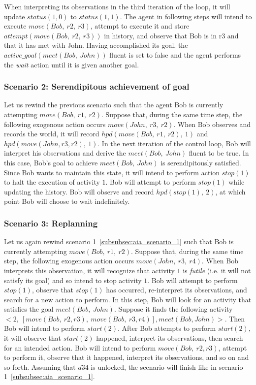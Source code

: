 When interpreting its observations in the third iteration of the loop, it will update $status(1,0)$ to $status(1,1)$.
The agent in following steps will intend to execute $move(Bob,\ r2,\ r3)$, attempt to execute it and store $attempt(move(Bob,\ r2,\ r3))$ in history, and observe that Bob is in r3 and that it has met with John.
Having accomplished its goal, the $active\_goal(meet(Bob,\ John))$ fluent is set to false and the agent performs the \textit{wait} action until it is given another goal.

\subsubsection{Scenario 2: Serendipitous achievement of goal~\cite{blount_towards_2014}}
\label{subsubsec:aia_scenario_2}

Let us rewind the previous scenario such that the agent Bob is currently attempting $move(Bob,\ r1,\ r2)$.
Suppose that, during the same time step, the following exogenous action occurs $move(John,\ r3,\ r2)$.
When Bob observes and records the world, it will record $hpd(move(Bob,\ r1,\ r2),\ 1)$ and $hpd(move(John,r3,r2),\ 1)$.
In the next iteration of the control loop, Bob will interpret his observations and derive the $meet(Bob,\ John)$ fluent to be true.
In this case, Bob's goal to achieve $meet(Bob,\ John)$ is serendipitously satisfied.
Since Bob wants to maintain this state, it will intend to perform action $stop(1)$ to halt the execution of activity $1$.
Bob will attempt to perform $stop(1)$ while updating the history.
Bob will observe and record $hpd(stop(1),\ 2)$, at which point Bob will choose to wait indefinitely.

\subsubsection{Scenario 3: Replanning~\cite{blount_towards_2014}}
\label{subsubsec:aia_scenario_3}

Let us again rewind scenario 1~\ref{subsubsec:aia_scenario_1} such that Bob is currently attempting $move(Bob,\ r1,\ r2)$.
Suppose that, during the same time step, the following exogenous action occurs $move(John,\ r3,\ r4)$.
When Bob interprets this observation, it will recognize that activity $1$ is \textit{futile} (i.e. it will not satisfy its goal) and so intend to stop activity $1$.
Bob will attempt to perform $stop(1)$, observe that $stop(1)$ has occurred, re-interpret its observations, and search for a new action to perform.
In this step, Bob will look for an activity that satisfies the goal $meet(Bob,\ John)$.
Suppose it finds the following activity $<2,\ [move(Bob,\ r2,r3),\ move(Bob,\ r3,r4)],meet(Bob,John)>$.
Then Bob will intend to perform $start(2)$.
After Bob attempts to perform $start(2)$, it will observe that $start(2)$ happened, interpret its observations, then search for an intended action.
Bob will intend to perform $move(Bob,\ r2,r3)$, attempt to perform it, observe that it happened, interpret its observations, and so on and so forth.
Assuming that $d34$ is unlocked, the scenario will finish like in scenario 1~\ref{subsubsec:aia_scenario_1}.

